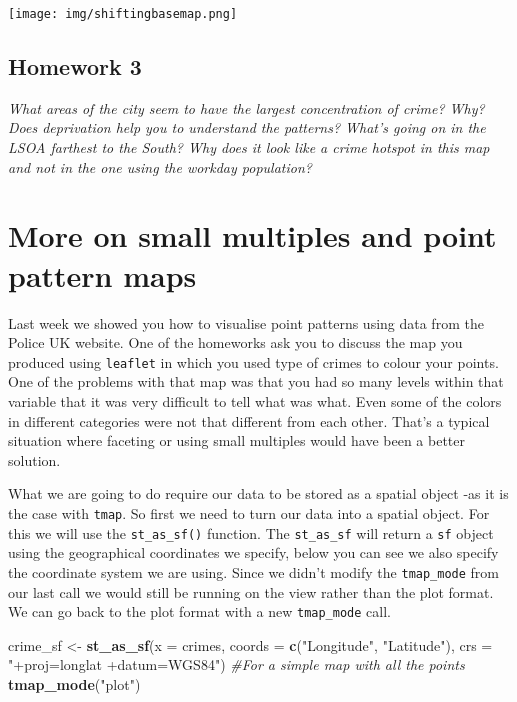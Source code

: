 \documentclass[]{book}
\newenvironment{Shaded}{\begin{snugshade}}{\end{snugshade}}
\newcommand{\CommentTok}[1]{\textcolor[rgb]{0.56,0.35,0.01}{\textit{#1}}}
\newcommand{\DataTypeTok}[1]{\textcolor[rgb]{0.13,0.29,0.53}{#1}}
\newcommand{\KeywordTok}[1]{\textcolor[rgb]{0.13,0.29,0.53}{\textbf{#1}}}
\newcommand{\NormalTok}[1]{#1}
\newcommand{\StringTok}[1]{\textcolor[rgb]{0.31,0.60,0.02}{#1}}
\begin{document}
\texttt{[image: img/shiftingbasemap.png]}

\hypertarget{homework-3}{%
\subsection{Homework 3}\label{homework-3}}

\emph{What areas of the city seem to have the largest concentration of crime? Why? Does deprivation help you to understand the patterns? What's going on in the LSOA farthest to the South? Why does it look like a crime hotspot in this map and not in the one using the workday population?}

\hypertarget{more-on-small-multiples-and-point-pattern-maps}{%
\section{More on small multiples and point pattern maps}\label{more-on-small-multiples-and-point-pattern-maps}}

Last week we showed you how to visualise point patterns using data from the Police UK website. One of the homeworks ask you to discuss the map you produced using \texttt{leaflet} in which you used type of crimes to colour your points. One of the problems with that map was that you had so many levels within that variable that it was very difficult to tell what was what. Even some of the colors in different categories were not that different from each other. That's a typical situation where faceting or using small multiples would have been a better solution.

What we are going to do require our data to be stored as a spatial object -as it is the case with \texttt{tmap}. So first we need to turn our data into a spatial object. For this we will use the \texttt{st\_as\_sf()} function. The \texttt{st\_as\_sf} will return a \texttt{sf} object using the geographical coordinates we specify, below you can see we also specify the coordinate system we are using. Since we didn't modify the \texttt{tmap\_mode} from our last call we would still be running on the view rather than the plot format. We can go back to the plot format with a new \texttt{tmap\_mode} call.

\begin{Shaded}
\begin{Highlighting}[]
\NormalTok{crime_sf <-}\StringTok{ }\KeywordTok{st_as_sf}\NormalTok{(}\DataTypeTok{x =}\NormalTok{ crimes, }
                        \DataTypeTok{coords =} \KeywordTok{c}\NormalTok{(}\StringTok{"Longitude"}\NormalTok{, }\StringTok{"Latitude"}\NormalTok{),}
                        \DataTypeTok{crs =} \StringTok{"+proj=longlat +datum=WGS84"}\NormalTok{)}
\CommentTok{#For a simple map with all the points}
\KeywordTok{tmap_mode}\NormalTok{(}\StringTok{"plot"}\NormalTok{)}
\end{Highlighting}
\end{Shaded}
\end{document}
